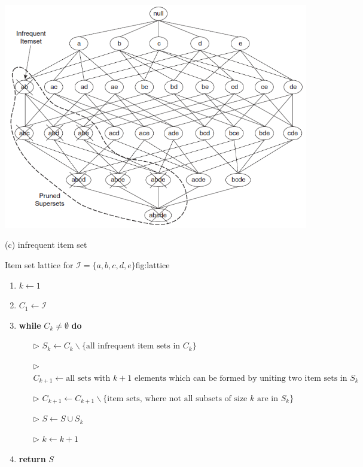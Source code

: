 \begin{frame}
{\begin{minipage}{0.30\textwidth}
			\includegraphics[scale=0.21]{16_association_rules/02_img/lattice3}
			\begin{center}(c) infrequent item set\end{center}
		\end{minipage}
	}{Item set lattice for $\mathcal{I} = \{ a, b, c, d, e \}$}{fig:lattice}
\end{frame}


\begin{frame}
	\begin{enumerate}
		\item $k \leftarrow 1$
		\item $C_1 \leftarrow \mathcal{I}$
		\item \textbf{while} $C_k \ne \emptyset$ \textbf{do}
		\begin{itemize}
			\item[$\triangleright$] $S_k \leftarrow C_k \backslash \{ \text{all infrequent item sets in $C_k$} \}$
			\item[$\triangleright$] $C_{k+1} \leftarrow \text{all sets with $k + 1$ elements which can be formed by uniting two item sets in $S_k$}$
			\item[$\triangleright$] $C_{k+1} \leftarrow C_{k+1} \backslash \{ \text{item sets, where not all subsets of size $k$ are in $S_k$} \}$
			\item[$\triangleright$] $S \leftarrow S \cup S_k$
			\item[$\triangleright$] $k \leftarrow k + 1$
		\end{itemize}
		\item \textbf{return} $S$
	\end{enumerate}

\end{frame}


